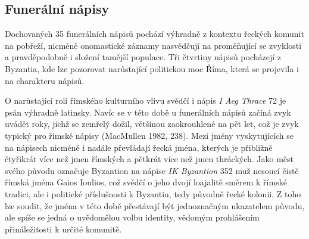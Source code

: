 
\subsection[funerální-nápisy-10]{Funerální nápisy}

Dochovaných 35 funerálních nápisů pochází výhradně z kontextu řeckých komunit na pobřeží, nicméně onomastické záznamy nasvědčují na proměňující se zvyklosti a pravděpodobně i složení tamější populace. Tři čtvrtiny nápisů pocházejí z Byzantia, kde lze pozorovat narůstající politickou moc Říma, která se projevila i na charakteru nápisů.

O narůstající roli římského kulturního vlivu svědčí i nápis {\em I Aeg Thrace} 72 je psán výhradně latinsky. Navíc se v této době u funerálních nápisů začíná zvyk uvádět roky, jichž se zemřelý dožil, většinou zaokrouhlené na pět let, což je zvyk typický pro římské nápisy (MacMullen 1982, 238). Mezi jmény vyskytujících se na nápisech nicméně i nadále převládají řecká jména, kterých je přibližně čtyřikrát více než jmen římských a pětkrát více než jmen thráckých. Jako měst svého původu označuje Byzantion na nápise {\em IK Byzantion} 352 muž nesoucí čistě římská jména Gaios Ioulios, což svědčí o jeho dvojí loajalitě směrem k římské tradici, ale i politické příslušnosti k Byzantiu, tedy původně řecké kolonii. Z toho lze soudit, že jména v této době přestávají být jednoznačným ukazatelem původu, ale spíše se jedná o uvědomělou volbu identity, vědomým prohlášením přináležitosti k určité komunitě.

